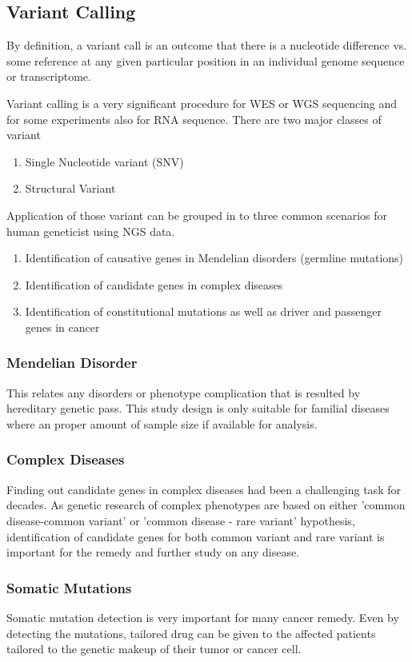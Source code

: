\documentclass{standalone}
\begin{document}
	\subsection{Variant Calling}
		By definition, a variant call is an outcome that there is a nucleotide difference vs. some reference at any given particular position in an individual genome sequence or transcriptome. 
		\par
		Variant calling is a very significant procedure for WES or WGS sequencing and for some experiments also for RNA sequence. There are two major classes of variant \cite{varan}
		\begin{enumerate}
			\item Single Nucleotide variant (SNV)
			\item Structural Variant
		\end{enumerate}
		Application of those variant can be grouped in to three common scenarios for human geneticist using NGS data.\cite{varan}
		\begin{enumerate}
			\item Identification of causative genes in Mendelian disorders (germline mutations)
			\item Identification of candidate genes in complex diseases
			\item Identification of constitutional mutations as well as driver and passenger genes in cancer
	\end{enumerate}
	\subsubsection{Mendelian Disorder}
		This relates any disorders or phenotype complication that is resulted by hereditary genetic pass. This study design is only suitable for familial diseases where an proper amount of sample size if available for analysis.
	\subsubsection{Complex Diseases}
		Finding out candidate genes in complex diseases had been a challenging task for decades. As genetic research of complex phenotypes are based on either 'common disease-common variant' or 'common disease - rare variant' hypothesis\cite{varan}, identification of candidate genes for both common variant and rare variant is important for the remedy and further study on any disease.
	\subsubsection{Somatic Mutations}
		Somatic mutation detection is very important for many cancer remedy. Even by detecting the mutations, tailored drug can be given to the affected patients tailored to the genetic makeup of their tumor or cancer cell.
		
\end{document}

